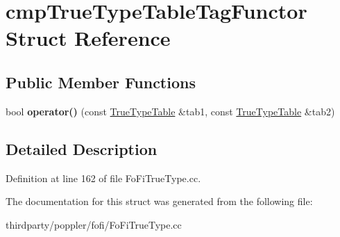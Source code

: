 \hypertarget{structcmp_true_type_table_tag_functor}{}\section{cmp\+True\+Type\+Table\+Tag\+Functor Struct Reference}
\label{structcmp_true_type_table_tag_functor}
\subsection*{Public Member Functions}
\begin{DoxyCompactItemize}
\item 
\mbox{\label{structcmp_true_type_table_tag_functor_a69f8b42b0bc9b68a667c41495dabb5a8}} 
bool {\bfseries operator()} (const \hyperlink{struct_true_type_table}{True\+Type\+Table} \&tab1, const \hyperlink{struct_true_type_table}{True\+Type\+Table} \&tab2)
\end{DoxyCompactItemize}


\subsection{Detailed Description}


Definition at line 162 of file Fo\+Fi\+True\+Type.\+cc.



The documentation for this struct was generated from the following file\+:\begin{DoxyCompactItemize}
\item 
thirdparty/poppler/fofi/Fo\+Fi\+True\+Type.\+cc\end{DoxyCompactItemize}
